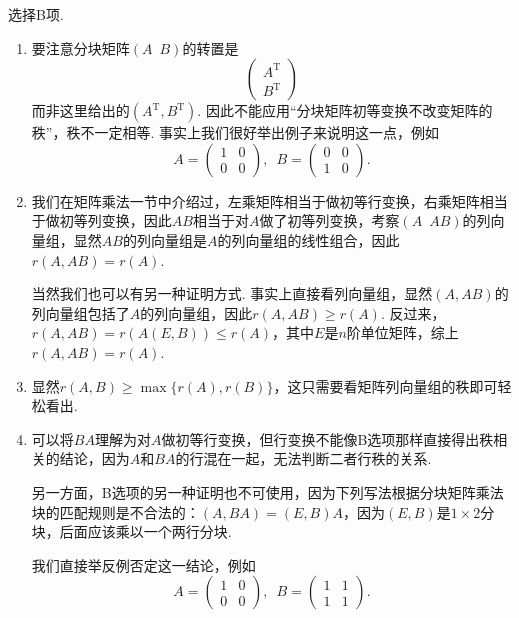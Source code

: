 \documentclass[UTF8,12pt,a4paper,fontset=fandol]{ctexart}
\begin{document}
\begin{solve}
选择B项.
    \begin{enumerate}[label=\Alph*.]
        \item 要注意分块矩阵$(A\enspace B)$的转置是
              \[\begin{pmatrix}
                      A^\mathrm{T} \\ B^\mathrm{T}
                  \end{pmatrix}\]
              而非这里给出的$(A^\mathrm{T}, B^\mathrm{T})$. 因此不能应用``分块矩阵初等变换不改变矩阵的秩''，秩不一定相等. 事实上我们很好举出例子来说明这一点，例如
              \[A=\begin{pmatrix}
                      1 & 0 \\ 0 & 0
                  \end{pmatrix},\enspace B=\begin{pmatrix}
                      0 & 0 \\ 1 & 0
                  \end{pmatrix}.\]

        \item 我们在矩阵乘法一节中介绍过，左乘矩阵相当于做初等行变换，右乘矩阵相当于做初等列变换，因此$AB$相当于对$A$做了初等列变换，考察$(A\enspace AB)$的列向量组，显然$AB$的列向量组是$A$的列向量组的线性组合，因此$r(A,AB)=r(A)$.

              当然我们也可以有另一种证明方式. 事实上直接看列向量组，显然$(A,AB)$的列向量组包括了$A$的列向量组，因此$r(A,AB)\geqslant r(A)$. 反过来，$r(A,AB)=r(A(E,B))\leqslant r(A)$，其中$E$是$n$阶单位矩阵，综上$r(A,AB)=r(A)$.

        \item 显然$r(A,B)\geqslant \max\{r(A), r(B)\}$，这只需要看矩阵列向量组的秩即可轻松看出.

        \item 可以将$BA$理解为对$A$做初等行变换，但行变换不能像B选项那样直接得出秩相关的结论，因为$A$和$BA$的行混在一起，无法判断二者行秩的关系.

              另一方面，B选项的另一种证明也不可使用，因为下列写法根据分块矩阵乘法块的匹配规则是不合法的：$(A,BA)=(E,B)A$，因为$(E,B)$是$1\times 2$分块，后面应该乘以一个两行分块.

              我们直接举反例否定这一结论，例如
              \[A=\begin{pmatrix}
                      1 & 0 \\ 0 & 0
                  \end{pmatrix},\enspace B=\begin{pmatrix}
                      1 & 1 \\ 1 & 1
                  \end{pmatrix}.\]
    \end{enumerate}
\end{solve}
\end{document}
